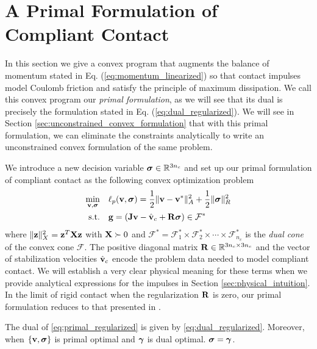 \section{A Primal Formulation of Compliant Contact}
\label{sec:primal_formulation}

In this section we give a convex program that augments the balance of momentum
stated in Eq. (\ref{eq:momentum_linearized}) so that contact impulses model
Coulomb friction and satisfy the principle of maximum dissipation.
We call this convex program our \emph{primal formulation}, as we will see that
its dual is precisely the formulation stated in Eq.
(\ref{eq:dual_regularized}). We will see in Section
\ref{sec:unconstrained_convex_formulation} that with this primal formulation,
we can eliminate the constraints analytically to write an unconstrained convex
formulation of the same problem.

We introduce a new decision variable ${\bm{\sigma}}\in\mathbb{R}^{3n_c}$ and
set up our primal formulation of compliant contact as the following convex
optimization problem
\begin{equation}
	\begin{aligned}
	\min_{\mf{v},\bsigma} \quad & \ell_p(\mf{v},\bsigma) =
	\frac{1}{2}\Vert\mf{v}-\mf{v}^*\Vert_{A}^2 +
	\frac{1}{2} \Vert\bsigma\Vert_{R}^2\\
	\textrm{s.t.} \quad & \mf{g} = (\mf{J}\mf{v}-\hat{\mf{v}}_c + \mf{R}\bsigma) \in \mathcal{F}^*\\
	\end{aligned}
	\label{eq:primal_regularized}
\end{equation}
where $\Vert{\mathbf{z}}\Vert_X^2={\mathbf{z}}^T{\mathbf{X}}{\mathbf{z}}$ with ${\mathbf{X}}\succ 0$ and
$\mathcal{F^*}= \mathcal{F}^*_1 \times \mathcal{F}^*_2 \times \cdots \times
\mathcal{F}^*_{n_c}$ is the \emph{dual cone} of the convex cone $\mathcal{F}$.
The positive diagonal matrix ${\mathbf{R}}\in\mathbb{R}^{3n_c\times 3n_c}$ and the
vector of stabilization velocities $\hat{{\mathbf{v}}}_c$ encode the problem data
needed to model compliant contact. We will establish a very clear physical
meaning for these terms when we provide analytical expressions for the impulses
in Section \ref{sec:physical_intuition}. In the limit of rigid contact
when the regularization ${\mathbf{R}}$ is zero, our primal formulation reduces to that
presented in \cite{bib:mazhar2014}.

\begin{theorem}\label{th:primal_dual}
The dual of \eqref{eq:primal_regularized} is given by 
\eqref{eq:dual_regularized}. Moreover, when $\{{\mathbf{v}},{\bm\sigma}\}$ is primal optimal and
${\bm\gamma}$ is dual optimal. ${\bm\sigma} = {\bm\gamma}$.
\end{theorem}

